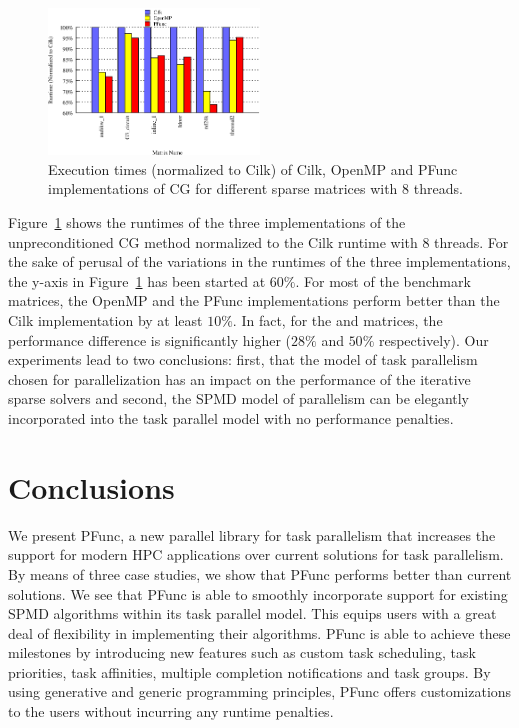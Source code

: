 \documentclass{sig-alternate}
\begin{document}
\begin{figure}[t]
\includegraphics[width=0.5\textwidth]{cgresults/cg_8}
\caption{Execution times (normalized to Cilk) of Cilk, OpenMP and PFunc
implementations of CG for different sparse matrices with 8 threads.}
\label{fig:cg8}
\end{figure}

Figure~\ref{fig:cg8} shows the runtimes of the three implementations of the
unpreconditioned CG method normalized to the Cilk runtime with 8 threads. 
For the sake of perusal of the variations in the runtimes of the three
implementations, the y-axis in Figure~\ref{fig:cg8} has been started at $60\%$.
For most of the benchmark matrices, the OpenMP and the PFunc implementations
perform better than the Cilk implementation by at least $10\%$. In fact, for
the  and  matrices, the performance difference is
significantly higher ($28\%$ and $50\%$ respectively). Our experiments lead to
two conclusions: first, that the model of task parallelism chosen for
parallelization has an impact on the performance of the iterative sparse
solvers and second, the SPMD model of parallelism can be elegantly incorporated
into the task parallel model with no performance penalties.

\section{Conclusions}
\label{sec:conclusion}
We present PFunc, a new parallel library for task parallelism that
increases the support for modern HPC applications over current solutions for
task parallelism.  By means of three case studies, we show that PFunc
performs better than current solutions.  We see that PFunc is able to
smoothly incorporate support for existing SPMD algorithms within its task
parallel model. This equips users with a great deal of flexibility in
implementing their algorithms.  PFunc is able to achieve these milestones by
introducing new features such as custom task scheduling, task priorities, task
affinities, multiple completion notifications and task groups. By using
generative and generic programming principles, PFunc offers customizations to
the users without incurring any runtime penalties.
\end{document}
